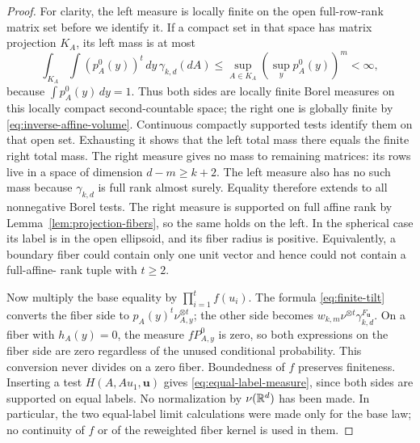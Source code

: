 \begin{proof}
For clarity, the left measure is locally finite on the open full-row-rank
matrix set before we identify it. If a compact set in that space has matrix
projection $K_A$, its left mass is at most
\[
 \int_{K_A}\!\int (p_A^0(y))^t\,dy\,\gamma_{k,d}(dA)
 \le \sup_{A\in K_A}(\sup_y p_A^0(y))^m<\infty,
\]
because $\int p_A^0(y)\,dy=1$. Thus both sides are locally finite Borel
measures on this locally compact second-countable space; the right one is
globally finite by \eqref{eq:inverse-affine-volume}. Continuous compactly
supported tests identify them on that open set. Exhausting it shows that
the left total mass there equals the finite right total mass. The right
measure gives no mass to remaining matrices: its rows live in a space of
dimension $d-m\ge k+2$. The left measure also has no such mass because
$\gamma_{k,d}$ is full rank almost surely. Equality therefore extends to
all nonnegative Borel tests. The right measure is
supported on full affine rank by Lemma~\ref{lem:projection-fibers}, so the
same holds on the left. In the spherical case its label is in the open
ellipsoid, and its fiber radius is positive. Equivalently, a boundary fiber
could contain only one unit vector and hence could not contain a full-affine-
rank tuple with $t\ge2$.

Now multiply the base equality by $\prod_{i=1}^t f(u_i)$. The formula
\eqref{eq:finite-tilt} converts the fiber side to $p_A(y)^t\nu_{A,y}^{\otimes t}$;
the other side becomes $w_{k,m}\nu^{\otimes t}\gamma_{k,d}^{F_{\mathbf u}}$.
On a fiber with $h_A(y)=0$, the measure $fP^0_{A,y}$ is zero, so both
expressions on the fiber side are zero regardless of the unused conditional
probability. This conversion never divides on a zero fiber.
Boundedness of $f$ preserves finiteness. Inserting a test
$H(A,Au_1,\mathbf u)$ gives \eqref{eq:equal-label-measure}, since both sides
are supported on equal labels. No normalization by $\nu(\mathbb R^d)$ has been
made. In particular, the two equal-label limit calculations were made only
for the base law; no continuity of $f$ or of the reweighted fiber kernel
is used in them.


\end{proof}
